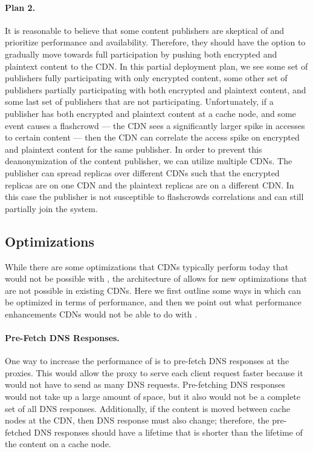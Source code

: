 \paragraph{Plan 2.} 
It is reasonable to believe that some content publishers are skeptical of \system{} and prioritize performance 
and availability.  Therefore, they should have the option to gradually move towards full participation by pushing 
both encrypted and plaintext content to the CDN.  In this partial deployment plan, we see some set of publishers 
fully participating with only encrypted content, some other set of publishers partially participating with both 
encrypted and plaintext content, and some last set of publishers that are not participating.  Unfortunately, if 
a publisher has both encrypted and plaintext content at a cache node, and some event causes a flashcrowd --- 
the CDN sees a significantly larger spike in accesses to certain content --- then the CDN can correlate the access 
spike on encrypted and plaintext content for the same publisher.  In order to prevent this deanonymization of the 
content publisher, we can utilize multiple CDNs.  The publisher can spread replicas over different CDNs such that 
the encrypted replicas are on one CDN and the plaintext replicas are on a different CDN.  In this case the publisher 
is not susceptible to flashcrowds correlations and can still partially join the system.

\subsection{Optimizations}
While there are some optimizations that CDNs typically perform today that would not be possible with \system{}, the architecture 
of \system{} allows for new optimizations that are not possible in existing CDNs.  Here we first outline some ways in which \system{} 
can be optimized in terms of performance, and then we point out what performance enhancements CDNs would not be able to do with 
\system{}.

\paragraph{Pre-Fetch DNS Responses.} One way to increase the performance of \system{} is to pre-fetch DNS responses at 
the proxies.  This would allow the proxy to serve each client request faster because it would not have to send 
as many DNS requests.  Pre-fetching DNS responses would not take up a large amount of space, but it also 
would not be a complete set of all DNS responses.  Additionally, if the content is moved between cache nodes 
at the CDN, then DNS response must also change; therefore, the pre-fetched DNS responses should have a 
lifetime that is shorter than the lifetime of the content on a cache node.

